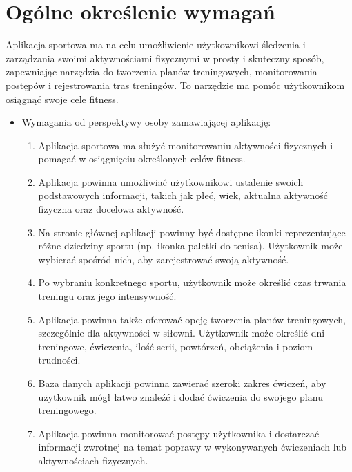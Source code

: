 \newpage
\section{Ogólne określenie wymagań}		%

Aplikacja sportowa ma na celu umożliwienie użytkownikowi śledzenia i zarządzania swoimi aktywnościami fizycznymi w prosty i skuteczny sposób, zapewniając narzędzia do tworzenia planów treningowych, monitorowania postępów i rejestrowania tras treningów. To narzędzie ma pomóc użytkownikom osiągnąć swoje cele fitness.

\begin{itemize}
    \item Wymagania od perspektywy osoby zamawiającej aplikację:
    \begin{enumerate}
        \item Aplikacja sportowa ma służyć monitorowaniu aktywności fizycznych i pomagać w osiągnięciu określonych celów fitness.
        
        \item Aplikacja powinna umożliwiać użytkownikowi ustalenie swoich podstawowych informacji, takich jak płeć, wiek, aktualna aktywność fizyczna oraz docelowa aktywność.

        \item Na stronie głównej aplikacji powinny być dostępne ikonki reprezentujące różne dziedziny sportu (np. ikonka paletki do tenisa). Użytkownik może wybierać spośród nich, aby zarejestrować swoją aktywność. 
        
       \item Po wybraniu konkretnego sportu, użytkownik może określić czas trwania treningu oraz jego intensywność.

       \item Aplikacja powinna także oferować opcję tworzenia planów treningowych, szczególnie dla aktywności w siłowni. Użytkownik może określić dni treningowe, ćwiczenia, ilość serii, powtórzeń, obciążenia i poziom trudności.

       \item Baza danych aplikacji powinna zawierać szeroki zakres ćwiczeń, aby użytkownik mógł łatwo znaleźć i dodać ćwiczenia do swojego planu treningowego.

       \item Aplikacja powinna monitorować postępy użytkownika i dostarczać informacji zwrotnej na temat poprawy w wykonywanych ćwiczeniach lub aktywnościach fizycznych.


\end{enumerate}
\end{itemize}
